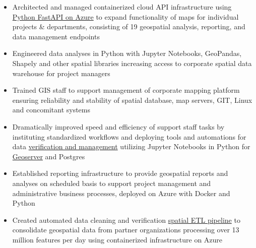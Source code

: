 \documentclass[letterpaper]{article}
\newenvironment{jobtasklist}
        {
            \vspace{-12pt}
            \begin{itemize} \itemsep 0pt
        }{
            \end{itemize}
            \vspace{-3pt}
        }
\newcommand{\impt}[1]{\uline{#1}}
\begin{document}
\begin{jobtasklist}
    \item Architected and managed containerized cloud API infrastructure using
        \impt{Python FastAPI on Azure} to expand functionality of maps for
        individual projects \& departments, consisting of 19 geospatial analysis,
        reporting, and data management endpoints

    \item Engineered data analyses in Python with Jupyter Notebooks, GeoPandas, Shapely
            and other spatial libraries
            increasing access to corporate spatial data warehouse for project managers

    \item Trained GIS staff to support management of corporate mapping platform ensuring reliability and stability of
            spatial database, map servers, GIT, Linux and concomitant systems


    \item Dramatically improved speed and efficiency of support staff tasks
            by instituting standardized workflows and
            deploying tools and automations for data \impt{verification and management}
            utilizing Jupyter Notebooks in Python for \impt{Geoserver} and Postgres

    \item Established reporting infrastructure
            to provide geospatial reports and analyses on
            scheduled basis to support project management and administrative business processes,
            deployed on Azure with Docker and Python

%
        \item Created automated data cleaning and verification \impt{spatial ETL pipeline} 
            to consolidate geospatial data
            from partner organizations processing over 13 million features per day
            using containerized infrastructure on Azure


\end{jobtasklist}
\end{document}
